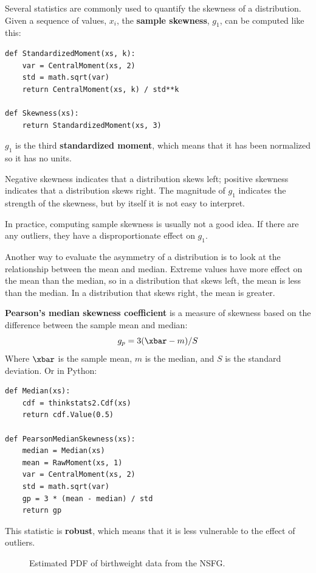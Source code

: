 Several statistics are commonly used to quantify the skewness of a
distribution.  Given a sequence of values, $x_i$, the {\bf sample
  skewness}, $g_1$, can be computed like this:

\begin{verbatim}
def StandardizedMoment(xs, k):
    var = CentralMoment(xs, 2)
    std = math.sqrt(var)
    return CentralMoment(xs, k) / std**k

def Skewness(xs):
    return StandardizedMoment(xs, 3)
\end{verbatim}

$g_1$ is the third {\bf standardized moment}, which means that it has
been normalized so it has no units.

Negative skewness indicates that a distribution 
skews left; positive skewness indicates
that a distribution skews right.  The magnitude of $g_1$ indicates
the strength of the skewness, but by itself it is not easy to
interpret.

In practice, computing sample skewness is usually not
a good idea.  If there are any outliers, they
have a disproportionate effect on $g_1$.

Another way to evaluate the asymmetry of a distribution is to look
at the relationship between the mean and median.
Extreme values have more effect on the mean than the median, so
in a distribution that skews left, the mean is less than the median.
In a distribution that skews right, the mean is greater.

{\bf Pearson's median skewness coefficient} is a measure
of skewness based on the difference between the
sample mean and median:
%
\[ g_p = 3 (\xbar - m) / S \]
%
Where $\xbar$ is the sample mean, $m$ is the median, and
$S$ is the standard deviation.  Or in Python:

\begin{verbatim}
def Median(xs):
    cdf = thinkstats2.Cdf(xs)
    return cdf.Value(0.5)

def PearsonMedianSkewness(xs):
    median = Median(xs)
    mean = RawMoment(xs, 1)
    var = CentralMoment(xs, 2)
    std = math.sqrt(var)
    gp = 3 * (mean - median) / std
    return gp
\end{verbatim}

This statistic is {\bf robust}, which means that it is less vulnerable
to the effect of outliers.

\begin{figure}
\caption{Estimated PDF of birthweight data from the NSFG.}
\label{density_totalwgt_kde}
\end{figure}


